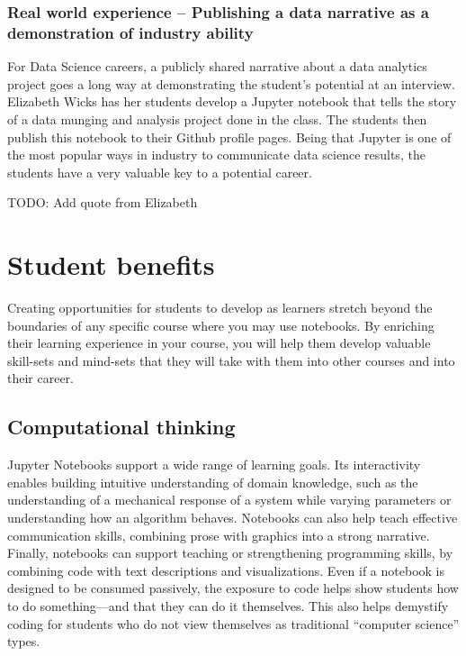 \documentclass[]{book}
\begin{document}
\subsubsection{Real world experience -- Publishing a data narrative as a
demonstration of industry
ability}\label{real-world-experience-publishing-a-data-narrative-as-a-demonstration-of-industry-ability}

For Data Science careers, a publicly shared narrative about a data
analytics project goes a long way at demonstrating the student's
potential at an interview. Elizabeth Wicks has her students develop a
Jupyter notebook that tells the story of a data munging and analysis
project done in the class. The students then publish this notebook to
their Github profile pages. Being that Jupyter is one of the most
popular ways in industry to communicate data science results, the
students have a very valuable key to a potential career.

TODO: Add quote from Elizabeth

\section{Student benefits}\label{student-benefits}

Creating opportunities for students to develop as learners stretch
beyond the boundaries of any specific course where you may use
notebooks. By enriching their learning experience in your course, you
will help them develop valuable skill-sets and mind-sets that they will
take with them into other courses and into their career.

\subsection{Computational thinking}\label{computational-thinking}

Jupyter Notebooks support a wide range of learning goals. Its
interactivity enables building intuitive understanding of domain
knowledge, such as the understanding of a mechanical response of a
system while varying parameters or understanding how an algorithm
behaves. Notebooks can also help teach effective communication skills,
combining prose with graphics into a strong narrative. Finally,
notebooks can support teaching or strengthening programming skills, by
combining code with text descriptions and visualizations. Even if a
notebook is designed to be consumed passively, the exposure to code
helps show students how to do something---and that they can do it
themselves. This also helps demystify coding for students who do not
view themselves as traditional ``computer science'' types.
\end{document}
